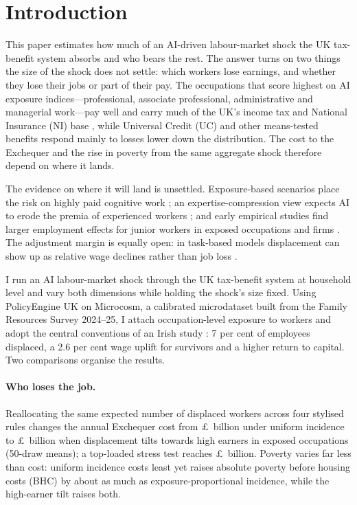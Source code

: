 \section{Introduction}

This paper estimates how much of an AI-driven labour-market shock the UK tax-benefit system absorbs and who bears the rest. The answer turns on two things the size of the shock does not settle: which workers lose earnings, and whether they lose their jobs or part of their pay. The occupations that score highest on AI exposure indices---professional, associate professional, administrative and managerial work---pay well and carry much of the UK's income tax and National Insurance (NI) base \citep{felten2021, eloundou2023, dsit2023, henseke2025}, while Universal Credit (UC) and other means-tested benefits respond mainly to losses lower down the distribution. The cost to the Exchequer and the rise in poverty from the same aggregate shock therefore depend on where it lands.

The evidence on where it will land is unsettled. Exposure-based scenarios place the risk on highly paid cognitive work \citep{felten2021, eloundou2023}; an expertise-compression view expects AI to erode the premia of experienced workers \citep{autor2024, hosseinilichtinger2026barriers}; and early empirical studies find larger employment effects for junior workers in exposed occupations and firms \citep{kleinteeselink2025, hosseini2026, brynjolfsson2025}. The adjustment margin is equally open: in task-based models displacement can show up as relative wage declines rather than job loss \citep{acemoglu2022tasks}.

I run an AI labour-market shock through the UK tax-benefit system at household level and vary both dimensions while holding the shock's size fixed. Using PolicyEngine UK on Microcosm, a calibrated microdataset built from the Family Resources Survey 2024--25, I attach occupation-level exposure to workers and adopt the central conventions of an Irish study \citep{doorley2026}: 7 per cent of employees displaced, a 2.6 per cent wage uplift for survivors and a higher return to capital. Two comparisons organise the results.

\paragraph{Who loses the job.} Reallocating the same expected number of displaced workers across four stylised rules changes the annual Exchequer cost from \pounds\genIncUniformCostMeanBn~billion under uniform incidence to \pounds\genIncCompressionCostMeanBn~billion when displacement tilts towards high earners in exposed occupations (50-draw means); a top-loaded stress test reaches \pounds\genIncKleinCostMeanBn~billion. Poverty varies far less than cost: uniform incidence costs least yet raises absolute poverty before housing costs (BHC) by about as much as exposure-proportional incidence, while the high-earner tilt raises both.

